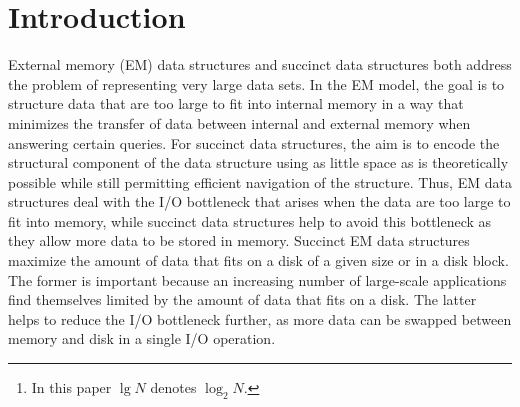 {\date{Received: date / Accepted: date}


\maketitle

\begin{abstract}

  We present a technique for representing bounded-degree planar graphs
  in a succinct fashion while permitting I/O-efficient traversal of
  paths.
  Using our representation, a graph with $N$ vertices, each
  with an associated key of $\bitsPerKey = \OhOf{\lg N}$ bits,\footnote{In this
    paper $\lg{N}$ denotes $\log_2{N}$.} can be stored in $N\bitsPerKey
  + \OhOf{N} + \ohOf{N\bitsPerKey}$ bits and traversing a path of length $K$ 
  takes $\OhOf{K
  / \lg B}$ I/Os, where $B$ denotes the disk block size.
  By applying our construction to the dual of a terrain represented as a
  triangular irregular network, we can represent the terrain in the
  above space bounds and support path traversals on the terrain using
  $\OhOf{K / \lg B}$ I/Os, where $K$ is the number of triangles visited by
  the path.
  This is useful for answering a number of queries on the
  terrain, such as reporting terrain profiles, trickle paths, and
  connected components.

\end{abstract}


\section{Introduction}

External memory (EM) data structures and succinct data structures both
address the problem of representing very large data sets.
In the EM model, the goal is to structure data that are too large to fit into
internal memory in a way that minimizes the transfer of data between
internal and external memory when answering certain queries.
For succinct data structures, the aim is to encode the structural
component of the data structure using as little space as is
theoretically possible while still permitting efficient navigation of
the structure.
Thus, EM data structures deal with the I/O bottleneck
that arises when the data are too large to fit into memory, while
succinct data structures help to avoid this bottleneck as they allow
more data to be stored in memory.
Succinct EM data structures maximize the amount of data that fits on a disk of
a given size or in a disk block.
The former is important because an increasing number of
large-scale applications find themselves limited by the amount of data
that fits on a disk.
The latter helps to reduce the I/O bottleneck further, as more data
can be swapped between memory and disk in a single I/O operation.

}
